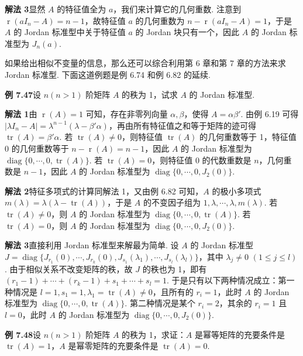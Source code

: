 \documentclass[UTF8, 12pt, fontset=fandol, oneside]{ctexart}
\begin{document}
\noindent\textbf{解法 3}\quad 显然 $A$ 的特征值全为 $a$，我们来计算它的几何重数. 注意到 $\operatorname{r}(aI_n-A)=n-1$，故特征值 $a$ 的几何重数为 $n-\operatorname{r}(aI_n-A)=1$，于是 $A$ 的 Jordan 标准型中关于特征值 $a$ 的 Jordan 块只有一个，因此 $A$ 的 Jordan 标准型为 $J_n(a)$.

如果给出相似不变量的信息，那么还可以综合利用第 6 章和第 7 章的方法来求 Jordan 标准型. 下面这道例题是例 6.74 和例 6.82 的延续.

\noindent\textbf{例 7.47}\quad 设 $n(n>1)$ 阶矩阵 $A$ 的秩为 1，试求 $A$ 的 Jordan 标准型.

\noindent\textbf{解法 1}\quad 由 $\operatorname{r}(A)=1$ 可知，存在非零列向量 $\alpha,\beta$，使得 $A=\alpha\beta'$. 由例 6.19 可得 $|\lambda I_n-A|=\lambda^{n-1}(\lambda-\beta'\alpha)$，再由所有特征值之和等于矩阵的迹可得 $\operatorname{tr}(A)=\beta'\alpha$. 若 $\operatorname{tr}(A)\ne 0$，则特征值 $\operatorname{tr}(A)$ 的几何重数等于 1，特征值 $0$ 的几何重数等于 $n-\operatorname{r}(A)=n-1$，因此 $A$ 的 Jordan 标准型为 $\operatorname{diag}\{0,\cdots,0,\operatorname{tr}(A)\}$. 若 $\operatorname{tr}(A)=0$，则特征值 $0$ 的代数重数是 $n$，几何重数是 $n-1$，因此 $A$ 的 Jordan 标准型为 $\operatorname{diag}\{0,\cdots,0,J_2(0)\}$.

\noindent\textbf{解法 2}\quad 特征多项式的计算同解法 1，又由例 6.82 可知，$A$ 的极小多项式 $m(\lambda)=\lambda(\lambda-\operatorname{tr}(A))$，于是 $A$ 的不变因子组为 $1,\lambda,\cdots,\lambda,m(\lambda)$. 若 $\operatorname{tr}(A)\ne 0$，则 $A$ 的 Jordan 标准型为 $\operatorname{diag}\{0,\cdots,0,\operatorname{tr}(A)\}$. 若 $\operatorname{tr}(A)=0$，则 $A$ 的 Jordan 标准型为 $\operatorname{diag}\{0,\cdots,0,J_2(0)\}$.

\noindent\textbf{解法 3}\quad 直接利用 Jordan 标准型来解最为简单. 设 $A$ 的 Jordan 标准型 $J=\operatorname{diag}\{J_{r_1}(0),\cdots,J_{r_k}(0),J_{s_1}(\lambda_1),\cdots,J_{s_l}(\lambda_l)\}$，其中 $\lambda_j\ne 0$ $(1\le j\le l)$. 由于相似关系不改变矩阵的秩，故 $J$ 的秩也为 1，即有 $(r_1-1)+\cdots+(r_k-1)+s_1+\cdots+s_l=1$. 于是只有以下两种情况成立：第一种情况是 $l=1,s_1=1,\lambda_1=\operatorname{tr}(A)\ne 0$，且所有的 $r_i=1$，此时 $A$ 的 Jordan 标准型为 $\operatorname{diag}\{0,\cdots,0,\operatorname{tr}(A)\}$. 第二种情况是某个 $r_i=2$，其余的 $r_i=1$ 且 $l=0$，此时 $A$ 的 Jordan 标准型为 $\operatorname{diag}\{0,\cdots,0,J_2(0)\}$.

\noindent\textbf{例 7.48}\quad 设 $n(n>1)$ 阶矩阵 $A$ 的秩为 1，求证：$A$ 是幂等矩阵的充要条件是 $\operatorname{tr}(A)=1$，$A$ 是幂零矩阵的充要条件是 $\operatorname{tr}(A)=0$.
\end{document}
